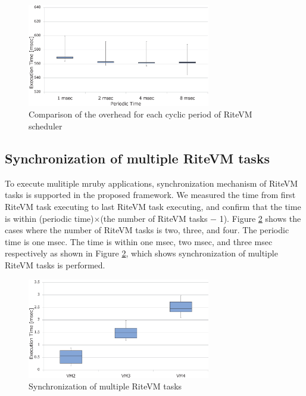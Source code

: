 \documentclass{sig-alternate-05-2015}
\begin{document}
\begin{figure}[t]
    \centering
    \includegraphics[width=8cm,clip]{figure/comparison_msec.eps}
    \vspace{1mm}
\caption{Comparison of the overhead for each cyclic period of RiteVM scheduler}
    \vspace{1mm}
\label{fig:comparison_msec}
\end{figure}

\subsection{Synchronization of multiple RiteVM tasks}
To execute mulitiple mruby applications, synchronization mechanism of RiteVM tasks is supported in the proposed framework.
We measured the time from first RiteVM task executing to last RiteVM task executing, and confirm that the time is within (periodic time)$\times$(the number of RiteVM tasks $-$ 1).
Figure \ref{fig:eval_synchronization} shows the cases where the number of RiteVM tasks is two, three, and four.
The periodic time is one msec.
The time is within one msec, two msec, and three msec respectively as shown in Figure \ref{fig:eval_synchronization}, which shows synchronization of multiple RiteVM tasks is performed.

\begin{figure}[t]
    \centering
    \includegraphics[width=8cm,clip]{figure/eval_synchronization.eps}
    \vspace{1mm}
\caption{Synchronization of multiple RiteVM tasks}
    \vspace{1mm}
\label{fig:eval_synchronization}
\end{figure}
\end{document}
